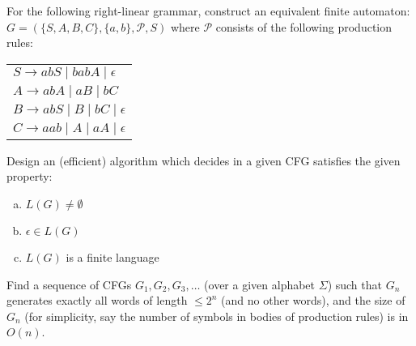 \documentclass[a4paper,12pt]{amsart}
\begin{document}
\medskip\begin{problem} 
    
    For the following right-linear grammar, construct an equivalent finite automaton: $G=(\{S,A,B,C\},\{a,b\},\mathcal P,S)$ where $\mathcal P$ consists of the following production rules:

    \bigskip
        
    \begin{center}
        \begin{tabular}{l}
            $S\rightarrow abS\mid babA\mid \epsilon $\\
            $A\rightarrow abA\mid aB \mid  bC$\\
            $B\rightarrow abS\mid B\mid bC\mid \epsilon $\\
            $C\rightarrow aab\mid A\mid aA\mid \epsilon $
        \end{tabular}
    \end{center}
    
\end{problem}


\medskip\begin{problem}
    
    Design an (efficient) algorithm which decides in a given CFG satisfies the given property:
    
    \medskip

    \begin{enumerate}[(a)]
        \item $L(G)\neq\emptyset$
        \item $\epsilon\in L(G)$
        \item $L(G)$ is a finite language
    \end{enumerate}

\end{problem}
    

\medskip\begin{problem}
    
    Find a sequence of CFGs $G_1,G_2,G_3,\dots$ (over a given alphabet $\Sigma$) such that $G_n$ generates exactly all words of length $\leq 2^n$ (and no other words), and the size of $G_n$ (for simplicity, say the number of symbols in bodies of production rules) is in $O(n)$.
    

\end{problem}
\end{document}
